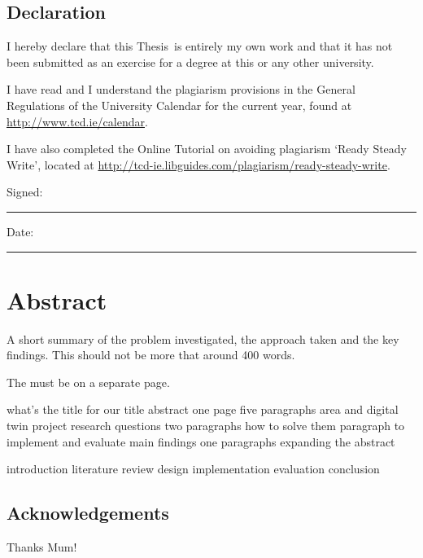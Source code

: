 \documentclass[a4paper,oneside,12pt]{book}
\title{\thesistitle}
\author{\authorname}
\newcommand{\typeofthesis}{Thesis} %
\begin{document}

\doublespacing

\section*{Declaration}
I hereby declare that this \typeofthesis\ is entirely my own work and that it has not been submitted as an exercise for a degree at this or any other university.

I have read and I understand the plagiarism provisions in the General Regulations of the University Calendar for the current year, found at \url{http://www.tcd.ie/calendar}.

I have also completed the Online Tutorial on avoiding plagiarism `Ready Steady Write', located at \url{http://tcd-ie.libguides.com/plagiarism/ready-steady-write}.
\vspace{1cm}

Signed:~\rule{5cm}{0.3pt}\hfill Date:~\rule{5cm}{0.3pt}


\newpage
\chapter{Abstract}
A short summary of the problem investigated, the approach taken and the key findings. This should not be more that around 400 words.

The must be on a separate page.


what’s the title for our title
abstract one page
five paragraphs 
area and digital twin
project research questions
two paragraphs how to solve them 
paragraph to implement and evaluate
main findings one paragraphs
expanding the abstract


introduction
literature review 
design implementation
evaluation
conclusion





\newpage
\raggedright %

\section*{\Huge{Acknowledgements}}
Thanks Mum!
\end{document}
